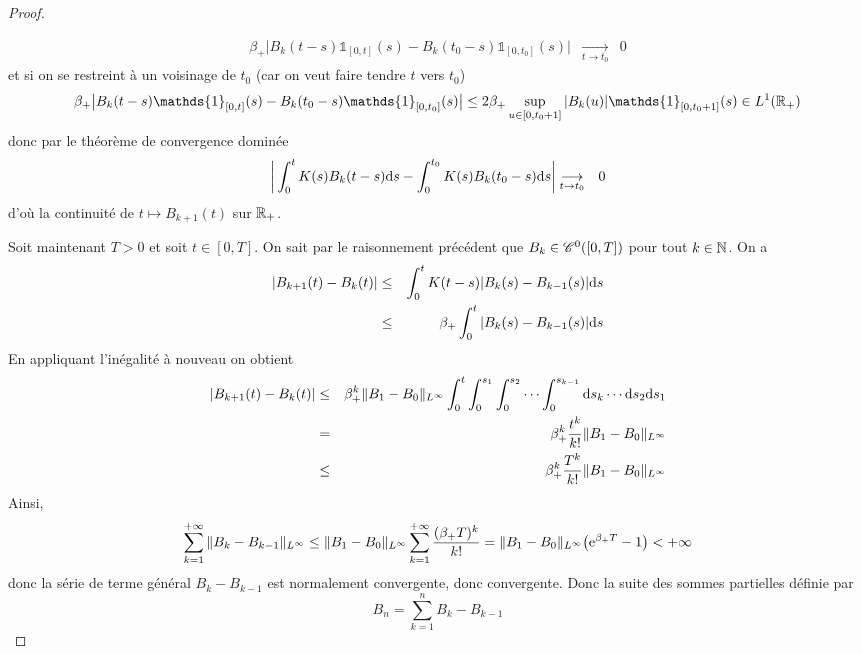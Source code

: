 \begin{proof}
\begin{itemize}
\begin{eqnarray*}
            \beta_+\big|B_k(t-s)\mathds{1}_{[0,t]}(s)
            - B_k(t_0-s)\mathds{1}_{[0,t_0]}(s)\big| &\underset{t \to t_0}{\longrightarrow}& 0
        \end{eqnarray*}
        et si on se restreint à un voisinage de $t_0$ (car on veut faire tendre $t$ vers $t_0$)
        \begin{equation*}
            \beta_+\big|B_k(t-s)\mathds{1}_{[0,t]}(s)
            - B_k(t_0-s)\mathds{1}_{[0,t_0]}(s)\big| \leq 2\beta_+\sup_{u \in [0,t_0+1]}|B_k(u)|\mathds{1}_{[0,t_0+1]}(s) \in L^1(\bbR_+)
        \end{equation*}
        donc par le théorème de convergence dominée
        \begin{eqnarray*}
            \bigg|\int_0^t K(s)B_k(t-s)\mathrm{d} s - \int_0^{t_0} K(s)B_k(t_0-s)\mathrm{d} s\bigg| &\underset{t \to t_0}{\longrightarrow}& 0
        \end{eqnarray*}
        d'où la continuité de $t \mapsto B_{k+1}(t)$ sur $\mathbb{R}_+$.
    \end{itemize}
    Soit maintenant $T >0$ et soit $t \in [0,T]$. On sait par le raisonnement précédent que $B_k \in \mathscr{C}^0([0,T])$ pour tout $k \in \mathbb{N}$. On a 
    \begin{eqnarray*}
        |B_{k+1}(t) - B_k(t)| &\leq& \int_0^tK(t-s)|B_k(s)-B_{k-1}(s)|\mathrm{d} s \\
        &\leq& \beta_+ \int_0^t |B_k(s)-B_{k-1}(s)|\mathrm{d} s
    \end{eqnarray*}
    En appliquant l'inégalité à nouveau on obtient 
    \begin{eqnarray*}
        |B_{k+1}(t) - B_k(t)| &\leq& \beta_+^k\|B_1-B_0\|_{L^{\infty}}\int_0^t \int_0^{s_1}\int_0^{s_2} \cdots \int_{0}^{s_{k-1}} \mathrm{d} s_k \cdots \mathrm{d} s_2 \mathrm{d} s_1 \\
        &=& \beta_+^k \frac{t^k}{k!}\|B_1-B_0\|_{L^{\infty}} \\
        &\leq& \beta_+^k \frac{T^k}{k!}\|B_1-B_0\|_{L^{\infty}}
    \end{eqnarray*}
    Ainsi,
    \begin{equation*}
        \sum_{k=1}^{+\infty}\|B_{k} - B_{k-1}\|_{L^{\infty}}\leq \|B_1-B_0\|_{L^{\infty}} \sum_{k=1}^{+\infty}\frac{(\beta_+ T)^k}{k!} = \|B_1-B_0\|_{L^{\infty}} \big(\mathrm{e}^{\beta_+ T} - 1\big) < +\infty
    \end{equation*}
    donc la série de terme général $B_{k} - B_{k-1}$ est normalement convergente, donc convergente. Donc la suite des sommes partielles définie par 
    \begin{equation*}
        B_n = \sum_{k=1}^nB_{k}-B_{k-1}

\end{equation*}
\end{proof}
